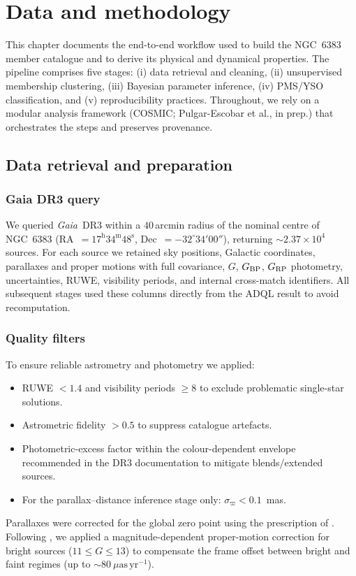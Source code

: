 \documentclass[../main.tex]{subfiles}
\begin{document}
\section{Data and methodology}
\label{sec:data-methodology}

This chapter documents the end-to-end workflow used to build the NGC~6383 member catalogue and to derive its physical and dynamical properties. The pipeline comprises five stages: (i) data retrieval and cleaning, (ii) unsupervised membership clustering, (iii) Bayesian parameter inference, (iv) PMS/YSO classification, and (v) reproducibility practices. Throughout, we rely on a modular analysis framework (\textsc{COSMIC}; Pulgar-Escobar et al., in prep.) that orchestrates the steps and preserves provenance.

\subsection{Data retrieval and preparation}
\label{subsec:data-prep}

\subsubsection{Gaia DR3 query}
We queried \textit{Gaia}~DR3 within a $40\,$arcmin radius of the nominal centre of NGC~6383 (RA~$=17^{\mathrm{h}}34^{\mathrm{m}}48^{\mathrm{s}}$, Dec~$=-32^{\circ}34'00''$), returning $\sim2.37\times10^4$ sources. For each source we retained sky positions, Galactic coordinates, parallaxes and proper motions with full covariance, $G$, $G_{\rm BP}$, $G_{\rm RP}$ photometry, uncertainties, RUWE, visibility periods, and internal cross-match identifiers. All subsequent stages used these columns directly from the ADQL result to avoid recomputation.

\subsubsection{Quality filters}
To ensure reliable astrometry and photometry we applied:
\begin{itemize}
  \item RUWE $<1.4$ and visibility periods $\ge 8$ to exclude problematic single-star solutions.
  \item Astrometric fidelity $>0.5$ \citep{2022MNRAS.510.2597R} to suppress catalogue artefacts.
  \item Photometric-excess factor within the colour-dependent envelope recommended in the DR3 documentation to mitigate blends/extended sources.
  \item For the parallax–distance inference stage only: $\sigma_\varpi < 0.1$~mas.
\end{itemize}
Parallaxes were corrected for the global zero point using the prescription of \citet{2021A&A...649A...2L}. Following \citet{2021A&A...649A.124C}, we applied a magnitude-dependent proper-motion correction for bright sources ($11\le G \le 13$) to compensate the frame offset between bright and faint regimes (up to $\sim80~\mu\mathrm{as\,yr^{-1}}$).
\end{document}
